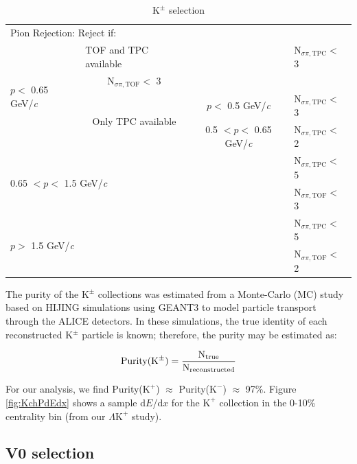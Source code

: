 \documentclass[ALICE,manyauthors]{cernphprep}
\newcommand{\KchP}{$\mathrm{K^{+}}$\xspace}
\newcommand{\KchM}{$\mathrm{K^{-}}$\xspace}
\newcommand{\Kpm}{$\mathrm{K^{\pm}}$\xspace}
\newcommand{\LamKchP}{$\Lambda\mathrm{K^{+}}$\xspace}
\begin{document}
\begin{table}[htbp]
\begin{tabular}{lc|c|l}
   \multicolumn{4}{l}{Pion Rejection:  Reject if:} \\
   \multirow{4}{*}{$p <$ 0.65 GeV/\textit{c}} & \multicolumn{1}{l}{TOF and TPC available} & \multicolumn{1}{c|}{} & N$_{\sigma \pi,\mathrm{TPC}} <$ 3 \\
   \multicolumn{3}{c|}{} & N$_{\sigma \pi,\mathrm{TOF}} <$ 3 \\
   \cline{2-4}
    & \multirow{2}{*}{Only TPC available} & $p <$ 0.5 GeV/\textit{c} & N$_{\sigma \pi,\mathrm{TPC}} <$ 3 \\
   \cline{3-4}
    &  & 0.5 $< p <$ 0.65 GeV/\textit{c} & N$_{\sigma \pi,\mathrm{TPC}} <$ 2 \\
   \cline{2-4}
   \multicolumn{3}{l|}{\multirow{2}{*}{0.65 $< p <$ 1.5 GeV/\textit{c}}} & N$_{\sigma \pi,\mathrm{TPC}} <$ 5 \\
    & \multicolumn{2}{c|}{} & N$_{\sigma \pi,\mathrm{TOF}} <$ 3 \\
   \cline{2-4}
   \multicolumn{3}{l|}{\multirow{2}{*}{$p >$ 1.5 GeV/\textit{c}}} & N$_{\sigma \pi,\mathrm{TPC}} <$ 5 \\
    & \multicolumn{2}{c|}{} & N$_{\sigma \pi,\mathrm{TOF}} <$ 2 \\
   \hline
  \end{tabular}
 \caption{\Kpm selection}
 \label{tab:KchCuts} 
\end{table}

The purity of the \Kpm collections was estimated from a Monte-Carlo (MC) study based on HIJING \cite{PhysRevD.44.3501} simulations using GEANT3 \cite{Brun:1994aa} to model particle transport through the ALICE detectors. In these simulations, the true identity of each reconstructed K$^{\pm}$ particle is known;  therefore, the purity may be estimated as:

\begin{equation}
 \rm Purity(K^{\pm}) = \frac{N_{true}}{N_{reconstructed}} \\
\label{eqn:KchPurity}
\end{equation}

For our analysis, we find Purity(\KchP) $\approx$ Purity(\KchM) $\approx$ 97\%.
Figure \ref{fig:KchPdEdx} shows a sample d$E$/d$x$ for the \KchP collection in the 0-10\% centrality bin (from our \LamKchP study).



\subsection{V0 selection}
\label{sec:V0Selection}
\end{document}
